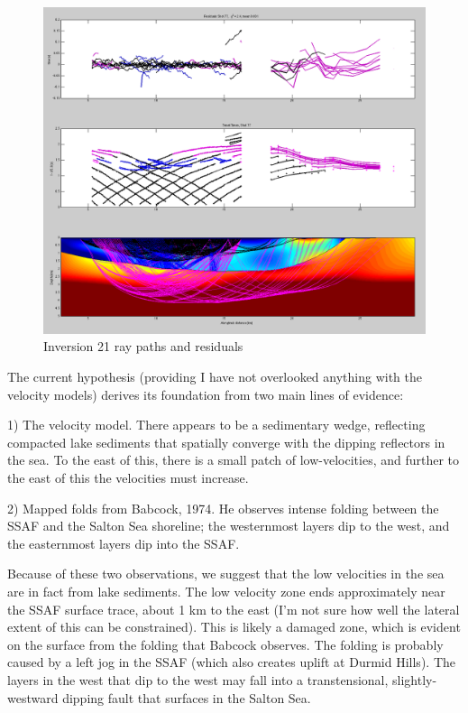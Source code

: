 \documentclass[fontsize=11pt, %
                             paper=a4, %
                             twoside, %
                             captions=tableheading,
                             index=totoc,
                             hyperref]{labbook}
\begin{document}
\begin{addmargin}[4cm]{0cm}
\begin{figure}[h!]
\raggedleft
\includegraphics[scale=0.3,keepaspectratio=true]{figs/inv21finalRay.png}
\caption{Inversion 21 ray paths and residuals}
\label{fig:inv21ray}
\end{figure}
 
The current hypothesis (providing I have not overlooked anything with the velocity models) derives its foundation from two main lines of evidence: 

1) The velocity model.  There appears to be a sedimentary wedge, reflecting compacted lake sediments that spatially converge with the dipping reflectors in the sea.  To the east of this, there is a small patch of low-velocities, and further to the east of this the velocities must increase.  

2) Mapped folds from Babcock, 1974.  He observes intense folding between the SSAF and the Salton Sea shoreline; the westernmost layers dip to the west, and the easternmost layers dip into the SSAF.

Because of these two observations, we suggest that the low velocities in the sea are in fact from lake sediments.  The low velocity zone ends approximately near the SSAF surface trace, about 1 km to the east (I'm not sure how well the lateral extent of this can be constrained).  This is likely a damaged zone, which is evident on the surface from the folding that Babcock observes.  The folding is probably caused by a left jog in the SSAF (which also creates uplift at Durmid Hills).  The layers in the west that dip to the west may fall into a transtensional, slightly-westward dipping fault that surfaces in the Salton Sea.  


\end{addmargin}
\end{document}
